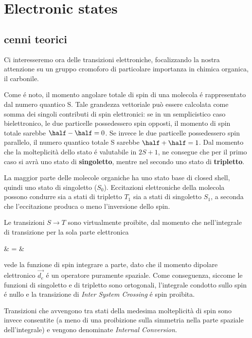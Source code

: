 \section{Electronic states}
\subsection{cenni teorici}

Ci interesseremo ora delle transizioni elettroniche, focalizzando la nostra attenzione
su un gruppo cromoforo di particolare importanza in chimica organica, il carbonile.

Come \'e noto, il momento angolare totale di spin di una molecola \'e
rappresentato dal numero quantico S. Tale grandezza vettoriale pu\`o essere 
calcolata come somma dei singoli contributi di spin elettronici: se in un 
semplicistico caso bielettronico, le due particelle possedessero spin opposti,
il momento di spin totale sarebbe $ \half - \half = 0 $. Se invece le due 
particelle possedessero spin parallelo, il numero quantico totale S sarebbe 
$ \half + \half = 1 $. Dal momento che la molteplicit\`a dello stato \'e 
valutabile in $ 2 S + 1 $, ne consegue che per il primo caso si avr\`a uno
stato di \textbf{singoletto}, mentre nel secondo uno stato di \textbf{tripletto}.

La maggior parte delle molecole organiche ha uno stato base di
closed shell, quindi uno stato di singoletto ($S_{0}$). Eccitazioni elettroniche
della molecola possono condurre sia a stati di tripletto $T_{1}$ sia a stati di
singoletto $S_{1}$, a seconda che l'eccitazione produca o meno l'inversione
dello spin.

Le transizioni $ S \rightarrow T $ sono virtualmente proibite, dal
momento che nell'integrale di transizione per la sola parte elettronica

\beqas
{} & = &
\eeqas

vede la funzione di spin integrare a parte, dato che il momento
dipolare elettronico $\overrightarrow{d_{e}}$ \'e un operatore 
puramente spaziale. 
Come conseguenza, siccome le funzioni di singoletto e di tripletto
sono ortogonali, l'integrale condotto sullo spin \'e nullo e la
transizione di \textit{Inter System Crossing} \'e spin proibita.

Transizioni che avvengono tra stati della medesima molteplicit\`a di spin
sono invece consentite (a meno di una proibizione sulla simmetria nella
parte spaziale dell'integrale) e vengono denominate \textit{Internal
Conversion}.

